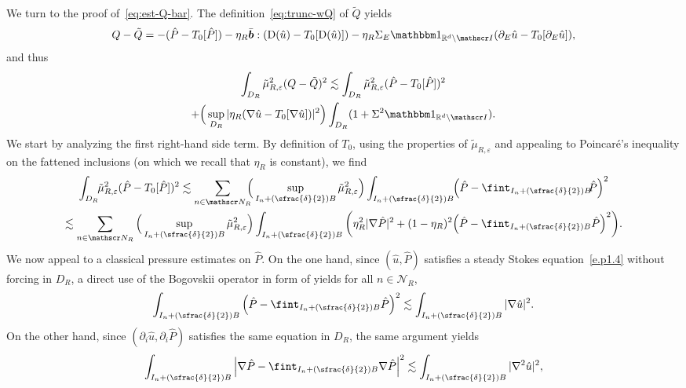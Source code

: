 \documentclass[10pt]{amsart}
\let\mathcal\mathscr
\newcommand{\Psfrac}[2]{(\sfrac{#1}{#2})}
\let\mathds\mathbbm
\theoremstyle{plain}
\theoremstyle{definition}
\newcommand{\e}{\varepsilon}
\newcommand{\R}{\mathbb R}
\newcommand{\Ic}{\mathcal I}
\newcommand{\Nc}{\mathcal N}
\newcommand{\D}{\operatorname{D}}
\newcommand{\bb}{\bar{\boldsymbol b}}
\begin{document}
We turn to the proof of~\eqref{eq:est-Q-bar}.
The definition~\eqref{eq:trunc-wQ} of $\tilde Q$ yields
\begin{equation*}
Q-\tilde Q=-(\hat P-T_0[\hat P])-\eta_R\bb:(\D(\hat u)- T_0[\D(\hat u)])-\eta_R\Sigma_E\mathds1_{\R^d\setminus\Ic}(\partial_E\hat u-T_0[\partial_E\hat u]),
\end{equation*}
and thus
\begin{multline}\label{e.p1.11+}
\int_{D_R}\tilde\mu_{R,\e}^2(Q-\tilde Q)^2\lesssim \int_{D_R}\tilde\mu_{R,\e}^2(\hat P-T_0[\hat P])^2\\
+\Big(\sup_{D_R}|\eta_R(\nabla\hat u- T_0[\nabla\hat u])|^2\Big)\int_{D_R}(1+\Sigma^2\mathds1_{\R^d\setminus\Ic}).
\end{multline}
We start by analyzing the first right-hand side term. By definition of $T_0$, using the properties of $\tilde\mu_{R,\e}$ and appealing to Poincaré's inequality on the fattened inclusions (on which we recall that $\eta_R$ is constant), we find
\begin{multline}\label{eq:bnd-hatPdiffT0}
\int_{D_R}\hspace*{-1mm}\tilde\mu_{R,\e}^2(\hat P-T_0[\hat P])^2\lesssim \sum_{n\in\Nc_R}\hspace*{-2mm}\Big(\sup_{I_n+\Psfrac\delta2 B}\tilde\mu_{R,\e}^2\Big)\int_{I_n+\Psfrac\delta2 B}\hspace*{-1mm}\Big(\hat P-\fint_{I_n+\Psfrac\delta2 B}\hspace*{-1mm}\hat P\Big)^2\\
\lesssim \sum_{n\in\Nc_R}\Big(\sup_{I_n+\Psfrac\delta2 B}\tilde\mu_{R,\e}^2\Big)\int_{I_n+\Psfrac\delta2 B}\bigg(\eta_R^2|\nabla\hat P|^2+(1-\eta_R)^2\Big(\hat P-\fint_{I_n+\Psfrac\delta2 B}\hat P\Big)^2\bigg).
\end{multline}
We now appeal to a classical pressure estimates on $\hat P$.
On the one hand, since $(\hat u,\hat P)$ satisfies a steady Stokes equation~\eqref{e.p1.4} without forcing in $D_R$, a direct use of the Bogovskii operator in form of \eg \cite[Th.\,III.3.1]{Galdi} yields for all $n\in\Nc_R$,
\begin{equation}\label{eq:bnd-hatPdiff}
\int_{I_n+\Psfrac\delta2 B}\Big(\hat P-\fint_{I_n+\Psfrac\delta2 B} \hat P\Big)^2\lesssim \int_{I_n+\Psfrac\delta2 B}|\nabla \hat u|^2.
\end{equation}
On the other hand, since $(\partial_i\hat u,\partial_i\hat P)$ satisfies the same equation in $D_R$, the same argument yields
\begin{equation*}
\int_{I_n+\Psfrac\delta2 B}\Big|\nabla\hat P-\fint_{I_n+\Psfrac\delta2 B}\nabla \hat P\Big|^2\lesssim \int_{I_n+\Psfrac\delta2 B}|\nabla^2 \hat u|^2,
\end{equation*}
\end{document}
